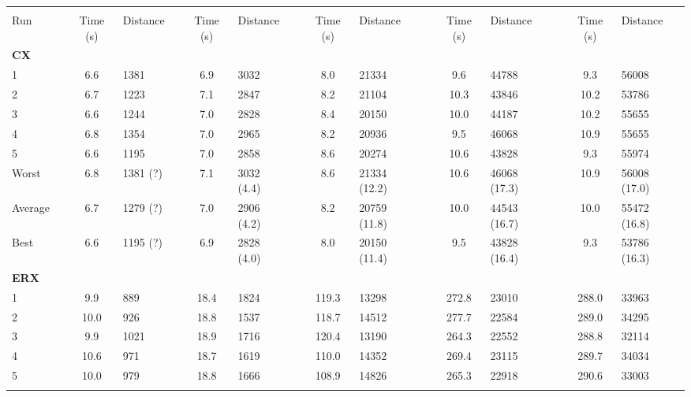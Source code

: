 \begin{sidewaystable}[hbpt]\centering
\footnotesize{
\begin{tabular} {l l S  l l S l l S l l S l l S l}
\toprule
&&  &&  &&   & & &&  \\          
Run & & {Time (s)} & Distance & & {Time (s)} & Distance && {Time (s)} & Distance && {Time (s)} & Distance && {Time (s)} & Distance \\ \midrule\addlinespace
\textbf{CX}\\
1   &&  6.6 & 1381 && 6.9 & 3032  && 8.0 & 21334  && 9.6 & 44788 && 9.3 & 56008 \\
2   &&  6.7 & 1223 && 7.1 & 2847  && 8.2 & 21104 && 10.3 & 43846 && 10.2 & 53786  \\
3   &&  6.6 & 1244 && 7.0 & 2828 &&  8.4 & 20150 && 10.0 & 44187 && 10.2 & 55655    \\
4   &&  6.8 & 1354 && 7.0 & 2965  && 8.2 & 20936 && 9.5 & 46068 && 10.9 & 55655 \\
5   &&  6.6 & 1195 &&  7.0 & 2858  && 8.6 & 20274 && 10.6 & 43828 && 9.3 & 55974  \\ \addlinespace
Worst  &&  6.8 & 1381 (?) && 7.1 & 3032 (4.4) && 8.6 & 21334 (12.2) && 10.6 & 46068 (17.3) && 10.9 & 56008 (17.0)  \\
Average&&  6.7 & 1279 (?) && 7.0 & 2906 (4.2) && 8.2 & 20759 (11.8) && 10.0 & 44543 (16.7) && 10.0 & 55472 (16.8)    \\
Best   && 6.6 & 1195 (?) && 6.9 & 2828 (4.0)  && 8.0 & 20150 (11.4)&& 9.5 & 43828 (16.4) && 9.3 & 53786 (16.3)    \\\midrule\addlinespace\addlinespace
\textbf{ERX}\\
1   &&  9.9 & 889 && 18.4 & 1824  &&  119.3 & 13298  && 272.8 & 23010 && 288.0 & 33963 \\
2   &&  10.0 & 926 && 18.8 & 1537  && 118.7 & 14512 && 277.7 & 22584 &&   289.0 & 34295    \\
3   &&  9.9 & 1021 && 18.9 & 1716 &&  120.4 & 13190 &&  264.3    & 22552  && 288.8   & 32114      \\
4   &&  10.6 & 971 && 18.7 & 1619  && 110.0     &  14352       && 269.4  & 23115 && 289.7  & 34034   \\
5   &&  10.0 & 979 && 18.8 & 1666  && 108.9       &  14826    && 265.3  & 22918  &&  290.6    & 33003    \\ \addlinespace

\end{tabular}}
\end{sidewaystable}
